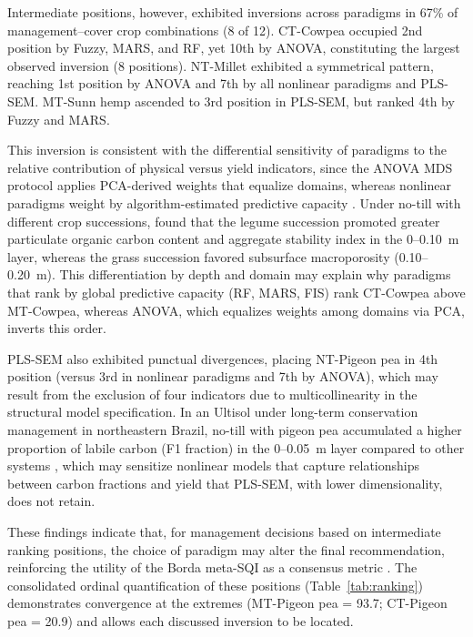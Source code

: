 \documentclass[pdflatex,sn-basic]{sn-jnl}%
\begin{document}
Intermediate positions, however, exhibited inversions across paradigms in 67\% of management--cover crop combinations (8 of 12). CT-Cowpea occupied 2nd position by Fuzzy, MARS, and RF, yet 10th by ANOVA, constituting the largest observed inversion (8 positions). NT-Millet exhibited a symmetrical pattern, reaching 1st position by ANOVA and 7th by all nonlinear paradigms and PLS-SEM. MT-Sunn hemp ascended to 3rd position in PLS-SEM, but ranked 4th by Fuzzy and MARS.

This inversion is consistent with the differential sensitivity of paradigms to the relative contribution of physical versus yield indicators, since the ANOVA MDS protocol applies PCA-derived weights that equalize domains, whereas nonlinear paradigms weight by algorithm-estimated predictive capacity \citep{Zeraatpisheh2020}. Under no-till with different crop successions, \cite{Fernandes2022} found that the legume succession promoted greater particulate organic carbon content and aggregate stability index in the 0--0.10~m layer, whereas the grass succession favored subsurface macroporosity (0.10--0.20~m). This differentiation by depth and domain may explain why paradigms that rank by global predictive capacity (RF, MARS, FIS) rank CT-Cowpea above MT-Cowpea, whereas ANOVA, which equalizes weights among domains via PCA, inverts this order.

PLS-SEM also exhibited punctual divergences, placing NT-Pigeon pea in 4th position (versus 3rd in nonlinear paradigms and 7th by ANOVA), which may result from the exclusion of four indicators due to multicollinearity in the structural model specification. In an Ultisol under long-term conservation management in northeastern Brazil, no-till with pigeon pea accumulated a higher proportion of labile carbon (F1 fraction) in the 0--0.05~m layer compared to other systems \citep{OliveiraFCC2024}, which may sensitize nonlinear models that capture relationships between carbon fractions and yield that PLS-SEM, with lower dimensionality, does not retain.

These findings indicate that, for management decisions based on intermediate ranking positions, the choice of paradigm may alter the final recommendation, reinforcing the utility of the Borda meta-SQI as a consensus metric \citep{Lin2010}. The consolidated ordinal quantification of these positions (Table~\ref{tab:ranking}) demonstrates convergence at the extremes (MT-Pigeon pea = 93.7; CT-Pigeon pea = 20.9) and allows each discussed inversion to be located.
\end{document}
